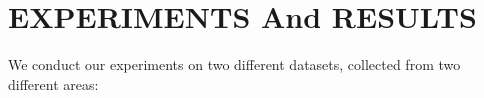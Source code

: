 \documentclass[conference]{IEEEtran}
\newcommand{\x}{\mathbf{x}}
\newcommand{\bea}{\mathbf{b}}
\begin{document}
{	\section{EXPERIMENTS And RESULTS}
	\label{sec:experiments}
	We conduct our experiments on two different datasets, collected from two different areas:  
}
\end{document}
